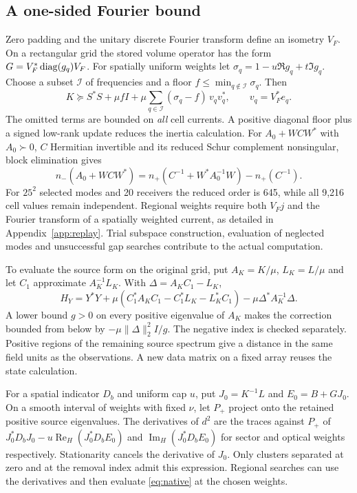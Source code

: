 \documentclass[anonymous,12pt]{iopjournal}
\newcommand{\Herm}{\operatorname{Re}_{H}}\newcommand{\Imag}{\operatorname{Im}_{H}}
\numberwithin{equation}{section}
\begin{document}
\subsection{A one-sided Fourier bound}
Zero padding and the unitary discrete Fourier transform define an isometry $V_F$. On a rectangular grid the stored volume operator has the form $G=V_F^*\operatorname{diag}(g_q)V_F$. For spatially uniform weights let $\sigma_q=1-u\Re g_q+t\Im g_q$. Choose a subset $\mathcal I$ of frequencies and a floor $f\le\min_{q\notin\mathcal I}\sigma_q$. Then
\begin{equation}
 K\succeq S^*S+\mu f I+
     \mu\sum_{q\in\mathcal I}(\sigma_q-f)\,v_qv_q^*,\qquad v_q=V_F^*e_q .
 \label{eq:floor}
\end{equation}
The omitted terms are bounded on \emph{all} cell currents. A positive diagonal floor plus a signed low-rank update reduces the inertia calculation. For $A_0+WCW^*$ with $A_0\succ0$, $C$ Hermitian invertible and its reduced Schur complement nonsingular, block elimination gives
\[
 n_-(A_0+WCW^*)=n_+(C^{-1}+W^*A_0^{-1}W)-n_+(C^{-1}).
\]
For $25^2$ selected modes and 20 receivers the reduced order is 645, while all 9,216 cell values remain independent. Regional weights require both $V_F j$ and the Fourier transform of a spatially weighted current, as detailed in Appendix~\ref{app:replay}. Trial subspace construction, evaluation of neglected modes and unsuccessful gap searches contribute to the actual computation.

To evaluate the source form on the original grid, put $A_K=K/\mu$, $L_K=L/\mu$ and let $C_1$ approximate $A_K^{-1}L_K$. With $\Delta=A_K C_1-L_K$,
\begin{equation}
 H_Y=Y^*Y+\mu(C_1^*A_KC_1-C_1^*L_K-L_K^*C_1)-\mu\Delta^*A_K^{-1}\Delta .
 \label{eq:native}
\end{equation}
A lower bound $g>0$ on every positive eigenvalue of $A_K$ makes the correction bounded from below by $-\mu\|\Delta\|_2^2 I/g$. The negative index is checked separately. Positive regions of the remaining source spectrum give a distance in the same field units as the observations. A new data matrix on a fixed array reuses the state calculation.

For a spatial indicator $D_b$ and uniform cap $u$, put $J_0=K^{-1}L$ and $E_0=B+GJ_0$. On a smooth interval of weights with fixed $\nu$, let $P_+$ project onto the retained positive source eigenvalues. The derivatives of $d^2$ are the traces against $P_+$ of $J_0^*D_bJ_0-u\Herm(J_0^*D_b E_0)$ and $\Imag(J_0^*D_b E_0)$ for sector and optical weights respectively. Stationarity cancels the derivative of $J_0$. Only clusters separated at zero and at the removal index admit this expression. Regional searches can use the derivatives and then evaluate \eqref{eq:native} at the chosen weights.
\end{document}
